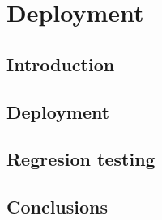 \chapter{Deployment}\label{cap:pruebas}

\section{Introduction}

\section{Deployment}

\section{Regresion testing}

\section{Conclusions}
